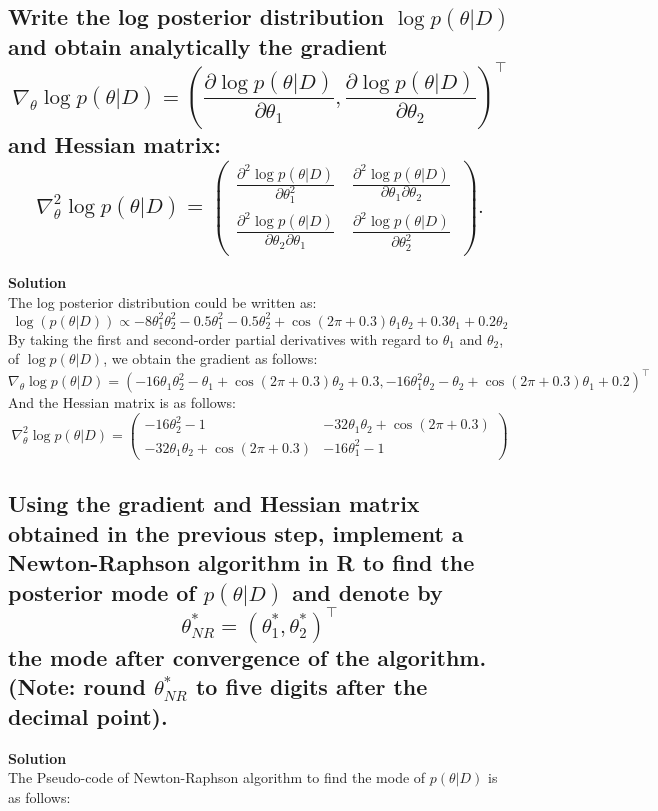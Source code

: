 \documentclass[12pt]{article}
\begin{document}
\subsection{Write the log posterior distribution \( \log p(\theta|D) \) and obtain analytically the gradient
\[\nabla_\theta \log p(\theta|D) = \left( \frac{\partial \log p(\theta|D)}{\partial \theta_1}, \frac{\partial \log p(\theta|D)}{\partial \theta_2} \right)^\top \]
and Hessian matrix:
\[\nabla^2_\theta \log p(\theta|D) = 
\begin{pmatrix}
\frac{\partial^2 \log p(\theta|D)}{\partial \theta_1^2} & \frac{\partial^2 \log p(\theta|D)}{\partial \theta_1 \partial \theta_2} \\
\frac{\partial^2 \log p(\theta|D)}{\partial \theta_2 \partial \theta_1} & \frac{\partial^2 \log p(\theta|D)}{\partial \theta_2^2} 
\end{pmatrix}.\]}
\textbf{Solution}\\
The log posterior distribution could be written as:
\[
\log(p(\theta|D)) \propto -8\theta_1^2\theta_2^2 - 0.5\theta_1^2 - 0.5\theta_2^2 + \cos(2\pi + 0.3)\theta_1\theta_2 + 0.3\theta_1 + 0.2\theta_2
\]
By taking the first and second-order partial derivatives with regard to \(\theta_1\) and \(\theta_2\), of \(\log p(\theta|D)\),
we obtain the gradient as follows:
\[
\nabla_\theta \log p(\theta|D) = \left( -16\theta_1\theta_2^2 - \theta_1 + \cos(2\pi + 0.3)\theta_2 + 0.3, -16\theta_1^2\theta_2 - \theta_2 + \cos(2\pi + 0.3)\theta_1 + 0.2 \right)^\top
\]
And the Hessian matrix is as follows:
\[
\nabla^2_\theta \log p(\theta|D) = 
\begin{pmatrix}
-16\theta_2^2 - 1 & -32\theta_1\theta_2 + \cos(2\pi + 0.3) \\
-32\theta_1\theta_2 + \cos(2\pi + 0.3) & -16\theta_1^2 - 1
\end{pmatrix}
\]

\subsection{Using the gradient and Hessian matrix obtained in the previous step, implement a Newton-Raphson algorithm in R to find the posterior mode of \( p(\theta|D) \) and denote by
\[
\theta^*_{NR} = (\theta^*_1, \theta^*_2)^\top
\]
the mode after convergence of the algorithm. (Note: round \( \theta^*_{NR} \) to five digits after the decimal point).}
\textbf{Solution}\\
The Pseudo-code of Newton-Raphson algorithm to find the mode of \( p(\theta|D) \) is as follows:
\end{document}

